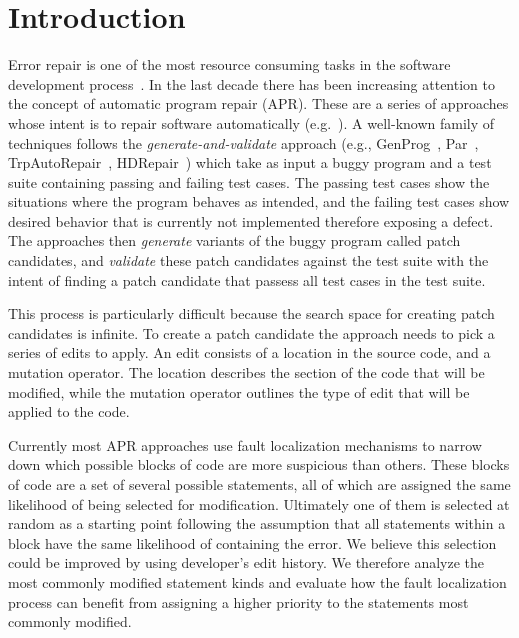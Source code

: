 \documentclass[sigconf]{acmart}
\begin{document}




\maketitle

\section{Introduction}
Error repair is one of the most resource consuming tasks in 
the software development process~\cite{Weiss07,Tassey02,Britton13}.
In the last decade there has been increasing attention to 
the concept of automatic program repair (APR). These are a 
series of approaches whose intent is to repair software
automatically (e.g.~\cite{legoues12,kim2013,Weimer13,long15SPR,long16proph,debroy10,perkins09,wei10}).
A well-known family of techniques follows the \emph{generate-and-validate}
approach (e.g., GenProg~\cite{legoues12}, 
Par~\cite{kim2013}, TrpAutoRepair~\cite{Qi13TrpAutoR}, HDRepair~\cite{xuan16}) 
which take as input a buggy program and a test suite containing
passing and failing test cases.
The passing test cases show the situations where the program  
behaves as intended, and the failing test cases show desired behavior
that is currently not implemented therefore exposing a defect.
The approaches then \emph{generate} variants of the buggy program
called patch candidates, and \emph{validate} these patch
candidates against the test suite with the intent of finding 
a patch candidate that passess all test cases in the test suite.

This process is particularly difficult because the search space
for creating patch candidates is infinite. To create a patch 
candidate the approach needs to pick a series of edits to apply.
An edit consists of a location in the source code,
and a mutation operator. The location describes the section
of the code that will be modified, while the mutation operator
outlines the type of edit that will be applied to the code.

Currently most APR approaches use fault localization mechanisms to 
narrow down which possible blocks of code are
more suspicious than others.  
These blocks of code are 
a set of several possible statements, all of which are assigned
the same likelihood of being selected for modification.
Ultimately one of them is selected at random as a starting point 
following the assumption that all statements within a block
have the same likelihood of containing the error.
We believe this selection could be improved by using
developer's
edit history. We therefore analyze the most commonly 
modified statement kinds and evaluate how the 
fault localization process can benefit from assigning
a higher priority to the statements most commonly modified.
\end{document}
